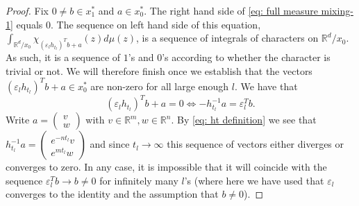 \documentclass[reqno,11pt, twoside]{amsart}
\theoremstyle{plain}
\newtheorem{claim}{Claim}[thm]
\theoremstyle{definition}
\theoremstyle{definition}
\theoremstyle{remark}
\numberwithin{equation}{section}
\newcommand{\R}{{\mathbb{R}}}
\newcommand{\N}{{\mathbb{N}}}
\newcommand{\ignore}[1]{{}}
\newcommand{\bR}{\mathbb{R}}
\newcommand\norm[1]{\|#1\|}
\newcommand\pa[1]{\left(#1\right)}
\newcommand\smallmat[1]{\pa{\begin{smallmatrix}#1\end{smallmatrix}}}
\begin{document}
\begin{proof}
    Fix $0\ne b\in x_1^*$ and $a\in x_0^*$. The right hand side of 
    \eqref{eq: full measure mixing-1} equals $0$. The sequence on left hand side of this equation, 
    $\int_{\bR^d/x_0} \chi_{(\varepsilon_l h_{t_l})^Tb+a}(z) d\mu(z)$,
    is a sequence of integrals of characters on $\bR^d/x_0$. As such, it
    is a sequence of $1$'s and $0$'s according to whether the character is trivial or not. We will therefore finish once we establish that the vectors $(\varepsilon_l h_{t_l})^Tb+a\in x_0^*$ are non-zero for all large enough $l$.  We have that
    $$(\varepsilon_lh_{t_l})^Tb+a = 0 \iff -h_{t_l}^{-1}a = \varepsilon_l^T b.$$
    Write $a=\smallmat{v\\w}$ with $v\in \bR^m,w\in \bR^n$. By \eqref{eq: ht definition} we see 
    that $h_{t_l}^{-1}a =\smallmat{e^{-n t_l}v\\ e^{mt_l}w}$ and since $t_l\to\infty$ this sequence of vectors either diverges or converges to zero. In any case, it is impossible that it will coincide with the sequence $\varepsilon_l^Tb\to b\ne 0$ for infinitely many $l$'s (where here we have used that $\varepsilon_l$ converges to the identity and the assumption that $b\ne 0$). 
    \ignore{
    \begin{claim}\label{claim: ht b infinity}
        When $b \neq 0$, the sequence of nonzero vectors $(\varepsilon_lh_{t_l}) ^T (b)_{l \in \N} \in \R^d$ has norm which either diverges or converges to zero.
    \end{claim}
    \begin{proof}[Proof of Claim \ref{claim: ht b infinity}]
        The sequence of vectors $(\varepsilon_l^T b)_{l \in \N}$ converges to $b$. Looking at the definition of $(h_t)_{t\in \R_{\geq 0}}$ in \eqref{eq: ht definition} and noting that the sequence $(t_l)_{l \in \N}$ is divergent, we see that the two cases of the present Claim follow according to whether $b$ has a nonzero component in its first $m$ entries or not.
    \end{proof}
    Claim \ref{claim: ht b infinity} implies that, when $b\neq 0$
    \begin{equation}\label{eq: full measure mixing}
        (\varepsilon_l h_{t_l})^T b + a \neq 0 \text{ for a cofinite set of } n \in \N.
    \end{equation}
    Indeed, if $\norm{(\varepsilon_l h_{t_l})^T b}\to\infty$, this is clear. If $(\varepsilon_l h_{t_l})^T b\to 0$, then since these vectors are non-zero, no matter what $a$ is we must have that $(\varepsilon_l h_{t_l})^T b+a\ne 0$ for all but finitely many $n$'s (in fact, since $(\varepsilon_l h_{t_l})^T b$ belongs to the dual lattice $x_0^*$, the possibility that 
    these non-zero vectors converge to $0$ is impossible). Equation
    \eqref{eq: full measure mixing} implies that for all but finitely many $n$'s the character $\exp( 2i\pi ((\varepsilon_l h_{t_l})^T b + a)| z)$
    on $\bR^d/x_0$ is non-trivial and so its integral is 0. In particular, the limit
    in \eqref{eq: right side lebesgue mixing} exists and equals 0.
    In all cases have shown that equality in \eqref{eq: full measure mixing-1} holds.
    }
\end{proof}
\end{document}

